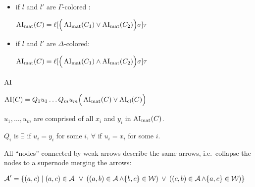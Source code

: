 \documentclass[,%
	paper=a4,%
	DIV10, %
	twoside=false,%
	liststotoc,
	bibtotoc,
	draft=false,%
	numbers=noendperiod
]{scrartcl}
\begin{document}
\begin{enumerate}
\begin{itemize}




			\item if $l$ and $l'$ are $\Gamma$-colored :

				$\operatorname{AI}_\mathrm{mat}(C) = \ell[\Big(\operatorname{AI}_\mathrm{mat}(C_1) \lor \operatorname{AI}_\mathrm{mat}(C_2)\Big)\sigma] \tau$
			\item if $l$ and $l'$ are $\Delta$-colored:

				$\operatorname{AI}_\mathrm{mat}(C) = \ell[\Big(\operatorname{AI}_\mathrm{mat}(C_1) \land \operatorname{AI}_\mathrm{mat}(C_2)\Big)\sigma] \tau$


		\end{itemize}

\end{enumerate}

\subsubsection{$\operatorname{AI}$}


$\operatorname{AI}(C) = Q_1 u_1 \ldots Q_m u_m \Big( \operatorname{AI}_\mathrm{mat}(C) \lor \operatorname{AI}_\mathrm{cl}(C) \Big)$

$u_1, \ldots, u_m$ are comprised of all $x_i$ and $y_i$ in $\operatorname{AI}_\mathrm{mat}(C)$. 

$Q_i$ is $\exists$ if $u_i = y_i$ for some $i$, $\forall$ if $u_i = x_i$ for some $i$.

All ``nodes'' connected by weak arrows describe the same arrows, i.e.~collapse the nodes to a supernode merging the arrows:


$\operatorname{\mathcal{A}}' = \{ (a,c) \mid  (a,c) \in  \operatorname{\mathcal{A}} \;\,{\lor}\;\, ((a,b) \in \operatorname{\mathcal{A}} \land \{b, c\} \in \operatorname{\mathcal{W}} ) \;\,{\lor}\;\,  ((c, b) \in \operatorname{\mathcal{A}} \land \{a, c\} \in \operatorname{\mathcal{W}}) \}$
	
\end{document}
